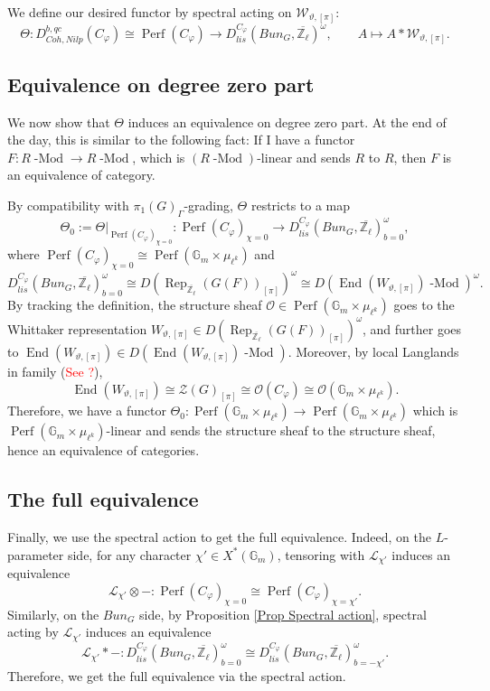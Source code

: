 \documentclass{article}
\newcommand{\red}[1]{\textcolor{red}{#1}}
\newcommand{\Rep}{\operatorname{Rep}}
\newcommand{\End}{\operatorname{End}}
\newcommand{\Modl}{\operatorname{-Mod}}
\newcommand{\Perf}{\operatorname{Perf}}
\begin{document}
We define our desired functor by spectral acting on $\mathcal{W}_{\vartheta, [\pi]}$:
$$\Theta: D^{b, qc}_{Coh, Nilp}(C_{\varphi}) \cong \Perf(C_{\varphi}) \longrightarrow D_{lis}^{C_{\varphi}}(Bun_G, \overline{\mathbb{Z}_{\ell}})^{\omega}, \qquad A \mapsto A*\mathcal{W}_{\vartheta, [\pi]}.$$

\subsection{Equivalence on degree zero part}

We now show that $\Theta$ induces an equivalence on degree zero part. At the end of the day, this is similar to the following fact: If I have a functor $F: R\Modl \to R\Modl$, which is $(R\Modl)$-linear and sends $R$ to $R$, then $F$ is an equivalence of category. 

By compatibility with $\pi_1(G)_{\Gamma}$-grading, $\Theta$ restricts to a map
$$\Theta_0:=\Theta|_{\Perf(C_{\varphi})_{\chi=0}}: \Perf(C_{\varphi})_{\chi=0} \longrightarrow D_{lis}^{C_{\varphi}}(Bun_G, \overline{\mathbb{Z}_{\ell}})^{\omega}_{b=0},$$
where $\Perf(C_{\varphi})_{\chi=0} \cong \Perf(\mathbb{G}_m \times \mu_{\ell^k})$ and 
$$D_{lis}^{C_{\varphi}}(Bun_G, \overline{\mathbb{Z}_{\ell}})^{\omega}_{b=0} \cong D(\Rep_{\overline{\mathbb{Z}_{\ell}}}(G(F))_{[\pi]})^{\omega} \cong D(\End(W_{\vartheta, [\pi]})\Modl)^{\omega}.$$
By tracking the definition, the structure sheaf $\mathcal{O} \in \Perf(\mathbb{G}_m \times \mu_{\ell^k})$ goes to the Whittaker representation $W_{\vartheta, [\pi]} \in D(\Rep_{\overline{\mathbb{Z}_{\ell}}}(G(F))_{[\pi]})^{\omega}$, and further goes to $\End(W_{\vartheta, [\pi]}) \in D(\End(W_{\vartheta, [\pi]})\Modl)$. Moreover, by local Langlands in family (\red{See ?}), 
$$\End(W_{\vartheta, [\pi]}) \cong \mathcal{Z}(G)_{[\pi]} \cong \mathcal{O}(C_{\varphi}) \cong \mathcal{O}(\mathbb{G}_m \times \mu_{\ell^k}).$$ Therefore, we have a functor $\Theta_0: \Perf(\mathbb{G}_m \times \mu_{\ell^k}) \to \Perf(\mathbb{G}_m \times \mu_{\ell^k})$ which is $\Perf(\mathbb{G}_m \times \mu_{\ell^k})$-linear and sends the structure sheaf to the structure sheaf, hence an equivalence of categories.

\subsection{The full equivalence}	

Finally, we use the spectral action to get the full equivalence. Indeed, on the $L$-parameter side, for any character $\chi' \in X^*(\mathbb{G}_m)$, tensoring with $\mathcal{\mathcal{L}_{\chi'}}$ induces an equivalence
$$\mathcal{\mathcal{L}_{\chi'}} \otimes -: \Perf(C_{\varphi})_{\chi=0} \cong \Perf(C_{\varphi})_{\chi=\chi'}.$$
Similarly, on the $Bun_G$ side, by Proposition \ref{Prop Spectral action}, spectral acting by $\mathcal{\mathcal{L}_{\chi'}}$ induces an equivalence
$$\mathcal{\mathcal{L}_{\chi'}}*-: D_{lis}^{C_{\varphi}}(Bun_G, \overline{\mathbb{Z}_{\ell}})^{\omega}_{b=0} \cong D_{lis}^{C_{\varphi}}(Bun_G, \overline{\mathbb{Z}_{\ell}})^{\omega}_{b=-\chi'}.$$ Therefore, we get the full equivalence via the spectral action.
	


\end{document}
